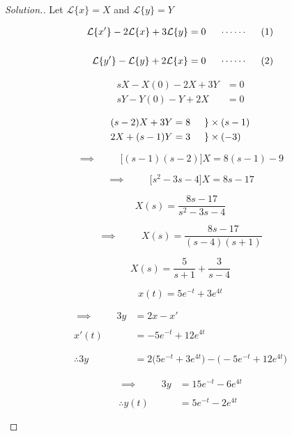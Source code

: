 \documentclass[11pt,a4paper]{article}
\theoremstyle{definition}
\newenvironment{solution}
  {\renewcommand{\qedsymbol}{}\begin{proof}[\textit{Solution}.]}
  {\end{proof}}
\begin{document}
\begin{solution}


Let $\mathcal{L}\{x\} = X$ and $\mathcal{L}\{y\} = Y$

\begin{align*}
\mathcal{L}\{x'\} - 2\mathcal{L}\{x\} + 3 \mathcal{L}\{y\} & = 0 \hspace{0.5cm}\cdots\cdots\hspace{0.5cm} (1)\\\\
\mathcal{L}\{y'\} - \mathcal{L}\{y\} + 2 \mathcal{L}\{x\} & = 0 \hspace{0.5cm}\cdots\cdots\hspace{0.5cm}  (2)
\end{align*}

\begin{align*}
sX - X(0) - 2X + 3Y & = 0\\
sY - Y(0) - Y + 2X & =0
\end{align*}

\begin{align*}
(s-2)X + 3Y = 8 \hspace{0.5cm}& \}\times (s-1)\\
2X + (s-1)Y = 3 \hspace{0.5cm}& \}\times (-3)
\end{align*}

$$\implies \hspace{1cm} \big[(s-1)(s-2)\big] X = 8(s-1) - 9$$

$$\implies \hspace{1cm} \big[s^2 - 3s -4\big]X = 8s - 17$$

$$X(s) = \frac{8s -17}{s^2 - 3s - 4}$$

$$\implies \hspace{1cm} X(s) = \frac{8s - 17}{(s-4)(s+1)}$$

$$X(s) = \frac{5}{s + 1} + \frac{3}{s - 4}$$

$$x(t) = 5e^{-t} + 3e^{4t}$$

\begin{align*}
\implies \hspace{1cm} 3y  & = 2x - x'\\\\
x'(t) & = -5e^{-t} + 12 e^{4t}\\\\\\
\therefore 3y & = 2 \big( 5e^{-t} + 3e^{4t}\big) - \big(-5e^{-t} + 12e^{4t}\big)
\end{align*}

\begin{align*}
\implies \hspace{1cm} 3y & = 15e^{-t} - 6e^{4t}\\\\
\therefore y(t) & = 5e^{-t} - 2e^{4t}\\\\
\end{align*}
\end{solution}
\end{document}
